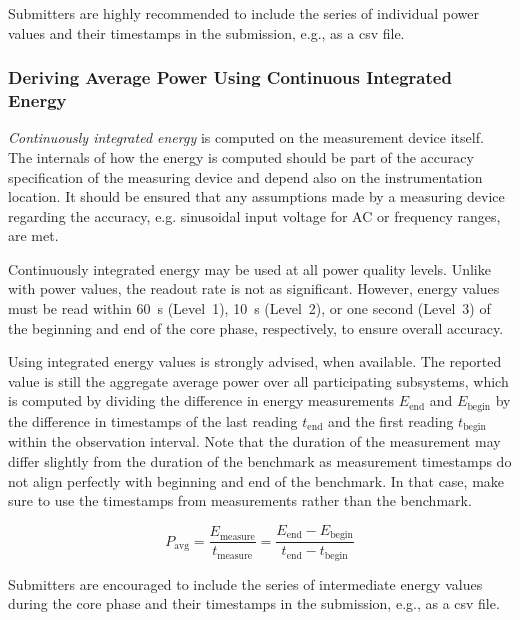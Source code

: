 Submitters are highly recommended to include the series of individual power values and their timestamps in the submission, e.g., as a csv file.

\subsubsection{Deriving Average Power Using Continuous Integrated Energy}

\emph{Continuously integrated energy} is computed on the measurement device itself.
The internals of how the energy is computed should be part of the accuracy specification of the measuring device and depend also on the instrumentation location.
It should be ensured that any assumptions made by a measuring device regarding the accuracy, e.g. sinusoidal input voltage for AC or frequency ranges, are met.

Continuously integrated energy may be used at all power quality levels.
Unlike with power values, the readout rate is not as significant.
However, energy values must be read within \SI{60}{\second} (Level~1), \SI{10}{\second} (Level~2), or one second (Level~3) of the beginning and end of the core phase, respectively, to ensure overall accuracy.

Using integrated energy values is strongly advised, when available.
The reported value is still the aggregate average power over all participating subsystems, which is computed by dividing the difference in energy measurements $E_\text{end}$ and $E_\text{begin}$ by the difference in timestamps of the last reading $t_\text{end}$ and the first reading $t_\text{begin}$ within the observation interval.
Note that the duration of the measurement may differ slightly from the duration of the benchmark as measurement timestamps do not align perfectly with beginning and end of the benchmark.
In that case, make sure to use the timestamps from measurements rather than the benchmark.

\begin{equation}
	P_{\text{avg}} = \frac{E_\text{measure}}{t_\text{measure}} = \frac{E_\text{end} - E_\text{begin}}{t_\text{end} - t_\text{begin}}
\end{equation}

Submitters are encouraged to include the series of intermediate energy values during the core phase and their timestamps in the submission, e.g., as a csv file.


